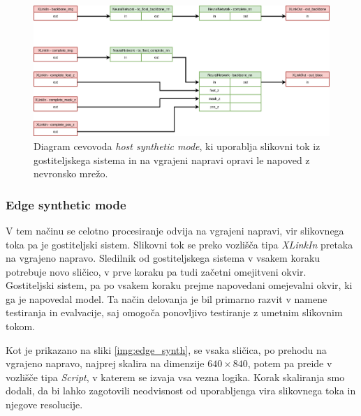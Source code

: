 \documentclass[a4paper,12pt,openright]{book}
\begin{document}
\begin{figure}[htb]
    \begin{center}
        \includegraphics[width=1\textwidth]{img/host_synth.png}
    \end{center}
    \caption{Diagram cevovoda \emph{host synthetic mode}, ki uporablja slikovni tok iz gostiteljskega sistema in na vgrajeni napravi opravi le napoved z nevronsko mrežo.}
    \label{img:host_synth}
\end{figure}


\subsubsection{Edge synthetic mode}
\label{sec:edge_synth}
V tem načinu se celotno procesiranje odvija na vgrajeni napravi, vir slikovnega toka pa je gostiteljski sistem. Slikovni tok se preko vozlišča tipa \emph{XLinkIn} pretaka na vgrajeno napravo. Sledilnik od gostiteljskega sistema v vsakem koraku potrebuje novo sličico, v prve koraku pa tudi začetni omejitveni okvir. Gostiteljski sistem, pa po vsakem koraku prejme napovedani omejevalni okvir, ki ga je napovedal model. Ta način delovanja je bil primarno razvit v namene testiranja in evalvacije, saj omogoča ponovljivo testiranje z umetnim slikovnim tokom.

Kot je prikazano na sliki \ref{img:edge_synth}, se vsaka sličica, po prehodu na vgrajeno napravo, najprej skalira na dimenzije $ 640 \times 840 $, potem pa preide v vozlišče tipa \emph{Script}, v katerem se izvaja vsa vezna logika. Korak skaliranja smo dodali, da bi lahko zagotovili neodvisnost od uporabljenga vira slikovnega toka in njegove resolucije.
\end{document}

